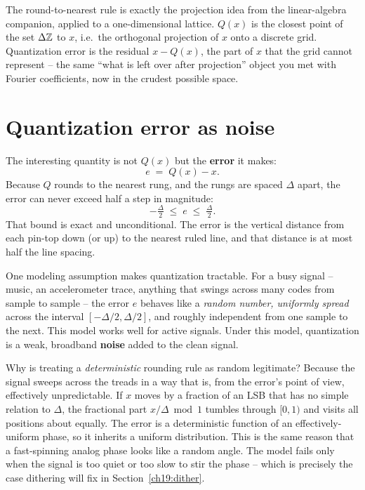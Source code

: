 \begin{connectionbox}
The round-to-nearest rule is exactly the projection idea from the linear-algebra companion,
applied to a one-dimensional lattice. $Q(x)$ is the closest point of the set $\Delta\mathbb{Z}$ to $x$,
i.e.\ the orthogonal projection of $x$ onto a discrete grid. Quantization error is the residual
$x - Q(x)$, the part of $x$ that the grid cannot represent -- the same ``what is left over after
projection'' object you met with Fourier coefficients, now in the crudest possible space.
\end{connectionbox}

\section{Quantization error as noise}
\label{ch19:error-as-noise}

The interesting quantity is not $Q(x)$ but the \textbf{error} it makes:
\[
  e \;=\; Q(x) - x.
\]
Because $Q$ rounds to the nearest rung, and the rungs are spaced $\Delta$ apart, the error can
never exceed half a step in magnitude:
\[
  -\tfrac{\Delta}{2} \;\le\; e \;\le\; \tfrac{\Delta}{2}.
\]
That bound is exact and unconditional. The error is the vertical distance from each pin-top down
(or up) to the nearest ruled line, and that distance is at most half the line spacing.

One modeling assumption makes quantization tractable. For a busy signal -- music, an accelerometer
trace, anything that swings across many codes from sample to sample -- the error $e$ behaves like
a \emph{random number, uniformly spread} across the interval $[-\Delta/2, \Delta/2]$, and roughly
independent from one sample to the next. This model works well for active signals. Under this model, quantization is a
weak, broadband \textbf{noise} added to the clean signal.

\begin{whybox}
Why is treating a \emph{deterministic} rounding rule as random legitimate? Because the signal
sweeps across the treads in a way that is, from the error's point of view, effectively
unpredictable. If $x$ moves by a fraction of an LSB that has no simple relation to $\Delta$, the
fractional part $x/\Delta \bmod 1$ tumbles through $[0,1)$ and visits all positions about
equally. The error is a deterministic function of an effectively-uniform phase, so it inherits a
uniform distribution. This is the same reason that a fast-spinning analog phase looks like a
random angle. The model fails only when the signal is too quiet or too slow to stir the
phase -- which is precisely the case dithering will fix in Section~\ref{ch19:dither}.
\end{whybox}

